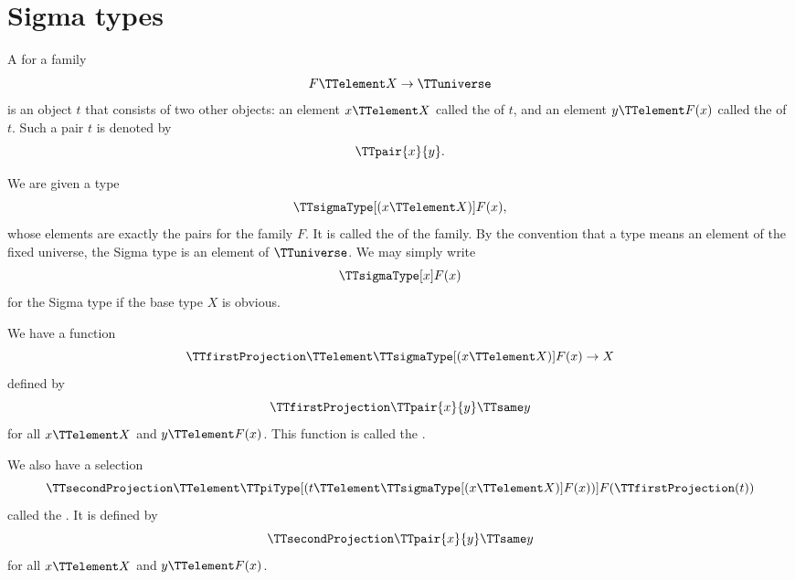 \documentclass{article}
\begin{document}
\section{Sigma types}
\label{sec:sigma-types}

A  for a family
\begin{equation*}
  F \TTelement X \to \TTuniverse
\end{equation*}
is an object $t$ that consists of two other objects: an element
$x \TTelement X$ called the  of $t$, and
an element $y \TTelement F(x)$ called the  of $t$.  Such a pair $t$ is denoted by
\begin{equation*}
  \TTpair{x}{y}.
\end{equation*}

We are given a type
\begin{equation*}
  \TTsigmaType[(x \TTelement X)] F(x),
\end{equation*}
whose elements are exactly the pairs for the family $F$.  It is called
the  of the family.  By the convention that a
type means an element of the fixed universe, the Sigma type is an
element of $\TTuniverse$.  We may simply write
\begin{equation*}
  \TTsigmaType[x] F(x)
\end{equation*}
for the Sigma type if the base type $X$ is obvious.

We have a function
\begin{equation*}
  \TTfirstProjection \TTelement
  \TTsigmaType[(x \TTelement X)] F(x) \to X
\end{equation*}
defined by
\begin{equation*}
  \TTfirstProjection \TTpair{x}{y} \TTsame y
\end{equation*}
for all $x \TTelement X$ and $y \TTelement F(x)$.  This function is
called the .

We also have a selection
\begin{equation*}
  \TTsecondProjection \TTelement
  \TTpiType[(t \TTelement \TTsigmaType[(x \TTelement X)] F(x))]{%
    F(\TTfirstProjection(t))}
\end{equation*}
called the .  It is defined by
\begin{equation*}
  \TTsecondProjection \TTpair{x}{y} \TTsame y
\end{equation*}
for all $x \TTelement X$ and $y \TTelement F(x)$.
\end{document}
